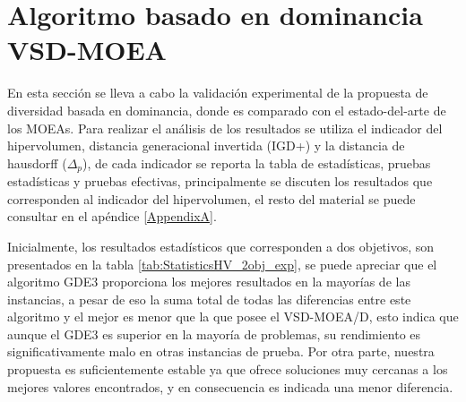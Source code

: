 \section{Algoritmo basado en dominancia VSD-MOEA}

En esta sección se lleva a cabo la validación experimental de la propuesta de diversidad basada en dominancia, donde es comparado con el estado-del-arte de los MOEAs.
% 
Para realizar el análisis de los resultados se utiliza el indicador del hipervolumen, distancia generacional invertida (IGD+) y la distancia de hausdorff ($\Delta_p$), de cada indicador se reporta la tabla de estadísticas, pruebas estadísticas y pruebas efectivas, principalmente se discuten los resultados que corresponden al indicador del hipervolumen, el resto del material se puede consultar en el apéndice \ref{AppendixA}.

Inicialmente, los resultados estadísticos que corresponden a dos objetivos, son presentados en la tabla \ref{tab:StatisticsHV_2obj_exp}, se puede apreciar que el algoritmo GDE3 proporciona los mejores resultados en la mayorías de las instancias, a pesar de eso la suma total de todas las diferencias entre este algoritmo y el mejor es menor que la que posee el VSD-MOEA/D, esto indica que aunque el GDE3 es superior en la mayoría de problemas, su rendimiento es significativamente malo en otras instancias de prueba.
%
Por otra parte, nuestra propuesta es suficientemente estable ya que ofrece soluciones muy cercanas a los mejores valores encontrados, y en consecuencia es indicada una menor diferencia.
%

